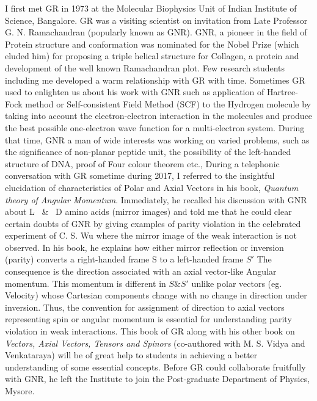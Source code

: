 I first met GR in 1973 at the Molecular Biophysics Unit of Indian Institute of Science, Bangalore. GR was a visiting scientist on invitation from Late Professor G. N. Ramachandran (popularly known as GNR). GNR, a pioneer in the field of Protein structure and conformation was nominated for the Nobel Prize (which eluded him) for proposing a triple helical structure for Collagen, a protein and development of the well known Ramachandran plot. Few research students including me developed a warm relationship with GR with time. Sometimes GR used to enlighten us about his work with GNR such as application of Hartree-Fock method or Self-consistent Field Method (SCF) to the Hydrogen molecule by taking into account the electron-electron interaction in the molecules and produce the best possible one-electron wave function for a multi-electron system. During that time, GNR a man of wide interests was working on varied problems, such as the significance of non-planar peptide unit, the possibility of the left-handed structure of DNA, proof of Four colour theorem etc., During a telephonic conversation with GR sometime during 2017, I referred to the insightful elucidation of characteristics of Polar and Axial Vectors in his book, \textit{Quantum theory of Angular Momentum}. Immediately, he recalled his discussion with GNR about L ~\&~ D amino acids (mirror images) and told me that he could clear certain doubts of GNR by giving examples of parity violation in the celebrated experiment of C. S. Wu where the mirror image of the weak interaction is not observed. In his book, he explains how either mirror reflection or inversion (parity) converts a right-handed frame S to a left-handed frame $S'$ The consequence is the direction associated with an axial vector-like Angular momentum. This momentum is different in $S \& S'$ unlike polar vectors (eg. Velocity) whose Cartesian components change with no change in direction under inversion. Thus, the convention for assignment of direction to axial vectors representing spin or angular momentum is essential for understanding parity violation in weak interactions. This book of GR along with his other book on \textit{Vectors, Axial Vectors, Tensors and Spinors} (co-authored with M. S. Vidya and Venkataraya) will be of great help to students in achieving a better understanding of some essential concepts. Before GR could collaborate fruitfully with GNR, he left the Institute to join the Post-graduate Department of Physics, Mysore.  

